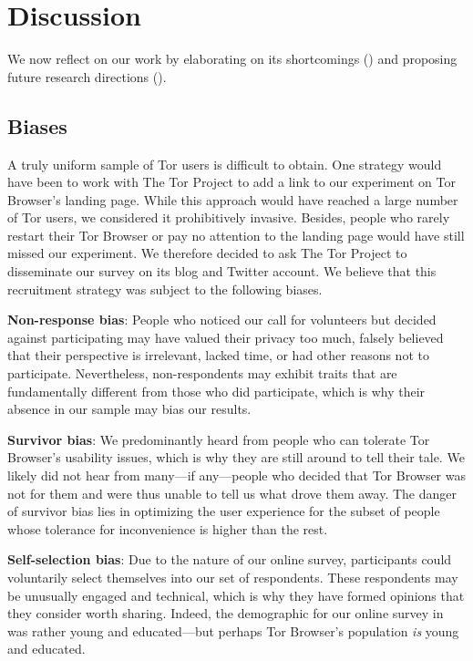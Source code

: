 \section{Discussion}
\label{sec:discussion}

We now reflect on our work by elaborating on its shortcomings
() and proposing future research directions
().

\subsection{Biases}
\label{sec:biases}

A truly uniform sample of Tor users is difficult to obtain.  One strategy would
have been to work with The Tor Project to add a link to our experiment on Tor
Browser's landing page.  While this approach would have reached a large number
of Tor users, we considered it prohibitively invasive.  Besides, people who
rarely restart their Tor Browser or pay no attention to the landing page would
have still missed our experiment.  We therefore decided to ask The Tor Project
to disseminate our survey on its blog and Twitter account.  We believe that this
recruitment strategy was subject to the following biases.

\textbf{Non-response bias}:
People who noticed our call for volunteers but decided against participating may
have valued their privacy too much, falsely believed that their perspective is
irrelevant, lacked time, or had other reasons not to participate.  Nevertheless,
non-respondents may exhibit traits that are fundamentally different from those
who did participate, which is why their absence in our sample may bias our
results.

\textbf{Survivor bias}:
We predominantly heard from people who can tolerate Tor Browser's usability
issues, which is why they are still around to tell their tale.  We likely did
not hear from many---if any---people who decided that Tor Browser was not for
them and were thus unable to tell us what drove them away.  The danger of
survivor bias lies in optimizing the user experience for the subset of people
whose tolerance for inconvenience is higher than the rest.

\textbf{Self-selection bias}:
Due to the nature of our online survey, participants could voluntarily select
themselves into our set of respondents.  These respondents may be unusually
engaged and technical, which is why they have formed opinions that they consider
worth sharing.  Indeed, the demographic for our online survey in
 was rather young and educated---but perhaps Tor
Browser's population \emph{is} young and educated.

